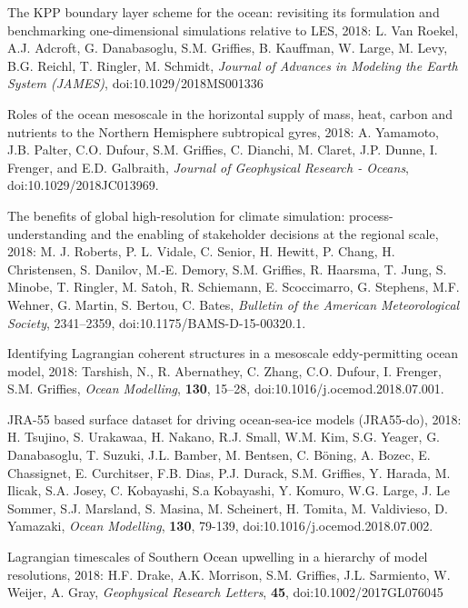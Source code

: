 \begin{etaremune}
\item The KPP boundary layer scheme for the ocean: revisiting its formulation and benchmarking one-dimensional simulations relative to LES,  2018: L. Van Roekel, A.J.  Adcroft, G. Danabasoglu, S.M. Grif\/f\/ies, B. Kauffman, W. Large, M. Levy, B.G. Reichl, T. Ringler, M. Schmidt, {\it Journal of Advances in Modeling the Earth System (JAMES)}, doi:10.1029/2018MS001336

\item Roles of the ocean mesoscale in the horizontal supply of mass, heat, carbon and nutrients to the Northern Hemisphere subtropical gyres, 2018: A. Yamamoto, J.B. Palter, C.O. Dufour, S.M. Grif\/f\/ies, C. Dianchi, M. Claret, J.P. Dunne, I. Frenger, and E.D. Galbraith, {\it Journal of Geophysical Research - Oceans},  doi:10.1029/2018JC013969.

\item The benefits of global high-resolution for climate simulation: process-understanding and the enabling of stakeholder decisions at the regional scale, 2018: M. J. Roberts, P. L. Vidale, C. Senior, H. Hewitt, P. Chang, H. Christensen, S. Danilov, M.-E. Demory, S.M. Grif\/f\/ies, R. Haarsma, T. Jung, S. Minobe, T. Ringler, M. Satoh, R. Schiemann, E. Scoccimarro, G. Stephens, M.F. Wehner, G. Martin, S. Bertou, C. Bates, {\it Bulletin of the American Meteorological Society}, 2341--2359, doi:10.1175/BAMS-D-15-00320.1. 

\item Identifying Lagrangian coherent structures in a mesoscale eddy-permitting ocean model, 2018: Tarshish, N., R. Abernathey, C. Zhang, C.O. Dufour, I. Frenger, S.M. Grif\/f\/ies, \textit{Ocean Modelling}, {\bf 130}, 15--28, doi:10.1016/j.ocemod.2018.07.001.

\item JRA-55 based surface dataset for driving ocean-sea-ice models (JRA55-do), 2018: H. Tsujino, S. Urakawaa, H. Nakano, R.J. Small, W.M. Kim, S.G. Yeager, G. Danabasoglu, T. Suzuki, J.L. Bamber, M. Bentsen, C. {B\"{o}ning}, A. Bozec, E. Chassignet, E. Curchitser, F.B. Dias, P.J. Durack, S.M. Grif\/f\/ies, Y. Harada, M. Ilicak, S.A. Josey, C. Kobayashi, S.a Kobayashi, Y. Komuro, W.G. Large, J. {Le Sommer}, S.J. Marsland, S. Masina, M. Scheinert, H. Tomita, M. Valdivieso, D. Yamazaki, {\it Ocean Modelling},  {\bf 130}, 79-139, doi:10.1016/j.ocemod.2018.07.002.

\item Lagrangian timescales of Southern Ocean upwelling in a hierarchy of model resolutions, 2018: H.F. Drake, A.K. Morrison, S.M. Grif\/f\/ies, J.L. Sarmiento, W. Weijer, A. Gray, {\it  Geophysical Research Letters}, {\bf 45}, doi:10.1002/2017GL076045


\end{etaremune}
